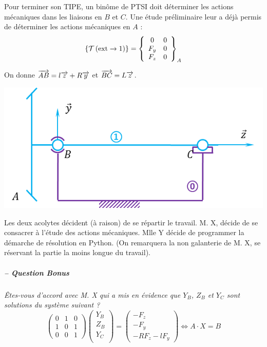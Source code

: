 \documentclass[10pt]{article}
\begin{document}
\setcounter{subparagraph}{0}
\begin{minipage}[c]{.47\linewidth}
Pour terminer son TIPE, un binôme de PTSI doit déterminer les actions mécaniques dans les liaisons en $B$ et $C$. Une étude préliminaire leur a déjà permis de déterminer les actions mécaniques en $A$ : 
$$
\torseurstat{T}{\text{ext}}{1} = 
\torseurcol{0}{F_y}{F_z}{0}{0}{0}{A}
$$

On donne $\vect{AB}=l\vect{z}+R\vect{y}$ et  $\vect{BC}=L\vect{z}$.
\end{minipage} \hfill
\begin{minipage}[c]{.47\linewidth}
\begin{center}
\includegraphics[width=.95\textwidth]{images/Schema}
\end{center}
\end{minipage} 

\vspace{.25cm}
Les deux acolytes décident (à raison) de se répartir le travail. M. X, décide de se consacrer à l'étude des actions mécaniques. Mlle Y décide de programmer la démarche de résolution en Python. (On remarquera la non galanterie de M. X, se réservant la partie la moins longue du travail). 

\subparagraph{-- Question Bonus}
\textit{Êtes-vous d'accord avec M. X qui a mis en évidence que $Y_B$, $Z_B$ et $Y_C$ sont solutions du système suivant ?
}
$$
 \left(
 \begin{array}{ccc}
 0 & 1 & 0 \\
 1 & 0 & 1 \\
 0 & 0 & 1
 \end{array}
 \right)
 \left(
 \begin{array}{c}
 Y_B \\ Z_B \\ Y_C \\ 
 \end{array}
 \right)
 = 
 \left(
 \begin{array}{c}
 -F_z \\
 -F_y \\
 - R  F_z  - l F_y 
 \end{array}
 \right)
 \Longleftrightarrow 
 A\cdot X = B
$$
\end{document}
